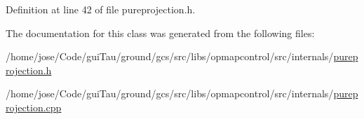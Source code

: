 Definition at line 42 of file pureprojection.\-h.



The documentation for this class was generated from the following files\-:\begin{DoxyCompactItemize}
\item 
/home/jose/\-Code/gui\-Tau/ground/gcs/src/libs/opmapcontrol/src/internals/\hyperlink{pureprojection_8h}{pureprojection.\-h}\item 
/home/jose/\-Code/gui\-Tau/ground/gcs/src/libs/opmapcontrol/src/internals/\hyperlink{pureprojection_8cpp}{pureprojection.\-cpp}\end{DoxyCompactItemize}
